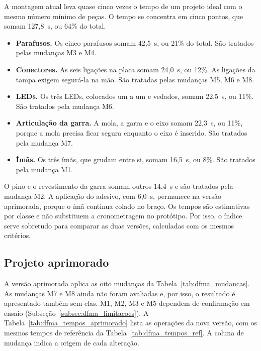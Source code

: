 A montagem atual leva quase cinco vezes o tempo de um projeto ideal com o mesmo número mínimo de peças. O tempo se concentra em cinco pontos, que somam 127,8~s, ou 64\% do total.

\begin{itemize}
    \item \textbf{Parafusos.} Os cinco parafusos somam 42,5~s, ou 21\% do total. São tratados pelas mudanças M3 e M4.
    \item \textbf{Conectores.} As seis ligações na placa somam 24,0~s, ou 12\%. As ligações da tampa exigem segurá-la na mão. São tratadas pelas mudanças M5, M6 e M8.
    \item \textbf{LEDs.} Os três LEDs, colocados um a um e vedados, somam 22,5~s, ou 11\%. São tratados pela mudança M6.
    \item \textbf{Articulação da garra.} A mola, a garra e o eixo somam 22,3~s, ou 11\%, porque a mola precisa ficar segura enquanto o eixo é inserido. São tratados pela mudança M7.
    \item \textbf{Ímãs.} Os três ímãs, que grudam entre si, somam 16,5~s, ou 8\%. São tratados pela mudança M1.
\end{itemize}

O pino e o revestimento da garra somam outros 14,4~s e são tratados pela mudança M2. A aplicação do adesivo, com 6,0~s, permanece na versão aprimorada, porque o ímã continua colado no braço. Os tempos são estimativas por classe e não substituem a cronometragem no protótipo. Por isso, o índice serve sobretudo para comparar as duas versões, calculadas com os mesmos critérios.

\subsection{Projeto aprimorado}
\label{subsec:dfma_aprimorado}

A versão aprimorada aplica as oito mudanças da Tabela~\ref{tab:dfma_mudancas}. As mudanças M7 e M8 ainda não foram avaliadas e, por isso, o resultado é apresentado também sem elas. M1, M2, M3 e M5 dependem de confirmação em ensaio (Subseção~\ref{subsec:dfma_limitacoes}). A Tabela~\ref{tab:dfma_tempos_aprimorado} lista as operações da nova versão, com os mesmos tempos de referência da Tabela~\ref{tab:dfma_tempos_ref}. A coluna de mudança indica a origem de cada alteração.

